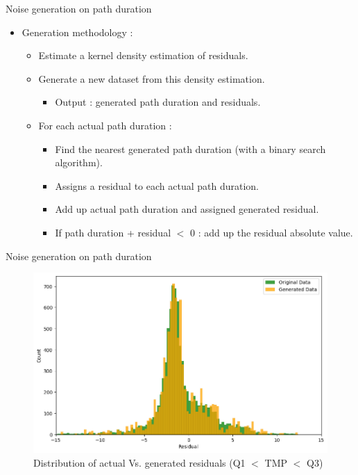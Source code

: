 \documentclass{beamer}
\begin{document}
\begin{frame}{Noise generation on path duration} 
    \begin{itemize}
        \item Generation methodology :
        \begin{itemize}
            \item Estimate a kernel density estimation of residuals.
    
            \item Generate a new dataset from this density estimation.
            \begin{itemize}
                \item Output : generated path duration and residuals.
            \end{itemize}
            \item For each actual path duration : 
            \begin{itemize}
                \item Find the nearest generated path duration (with a binary search algorithm).
                \item Assigns a residual to each actual path duration.
                \item Add up actual path duration and assigned generated residual.
                \item If  path duration + residual $<$ 0 : add up the residual absolute value.
    
            \end{itemize}
        \end{itemize}
    \end{itemize}
\end{frame}






\begin{frame}{Noise generation on path duration} 
\begin{figure}[ht]
  \centering
    \includegraphics[width=\linewidth]{Q1_Q3 distribution actual Vs. generated.png}
    \caption{Distribution of actual Vs. generated residuals (Q1 $<$ TMP $<$ Q3)}
    \label{fig:Q1_Q3 distribution actual Vs. generated}
\end{figure}
\end{frame}
\end{document}
